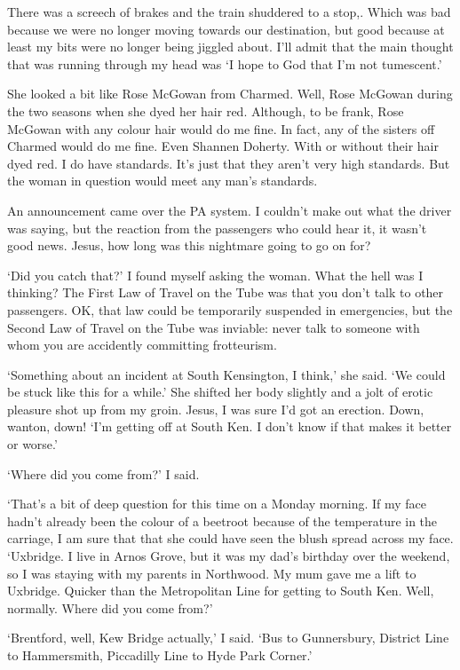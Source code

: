 There was a screech of brakes and the train shuddered to a stop,.
Which was bad because we were no longer moving towards our
destination, but good because at least my bits were no longer being
jiggled about. I'll admit that the main thought that was running
through my head was `I hope to God that I'm not tumescent.'

She looked a bit like Rose McGowan from {\twelvesl Charmed\/}. Well,
Rose McGowan during the two seasons when she dyed her hair red.
Although, to be frank, Rose McGowan with any colour hair would do me
fine. In fact, any of the sisters off {\twelvesl Charmed\/} would do me fine. Even
Shannen Doherty. With or without their hair dyed red. I do have
standards. It's just that they aren't very high standards. But the
woman in question would meet any man's standards.

An announcement came over the PA system. I couldn't make out what
the driver was saying, but the reaction from the passengers who
could hear it, it wasn't good news. Jesus, how long was this
nightmare going to go on for?

`Did you catch that?' I found myself asking the woman. What the hell
was I thinking? The First Law of Travel on the Tube was that you
don't talk to other passengers. OK, that law could be temporarily
suspended in emergencies, but the Second Law of Travel on the Tube
was inviable: never talk to someone with whom you are accidently
committing frotteurism.

`Something about an incident at South Kensington, I think,' she
said. `We could be stuck like this for a while.' She shifted her
body slightly and a jolt of erotic pleasure shot up from my groin.
Jesus, I was sure I'd got an erection. Down, wanton, down! `I'm
getting off at South Ken. I don't know if that makes it better or
worse.'

`Where did you come from?' I said.

`That's a bit of deep question for this time on a Monday morning. If
my face hadn't already been the colour of a beetroot because of the
temperature in the carriage, I am sure that that she could have seen
the blush spread across my face. `Uxbridge. I live in Arnos Grove, but
it was my dad's birthday over the weekend, so I was staying with my
parents in Northwood. My mum gave me a lift to Uxbridge.
Quicker than the Metropolitan Line for getting to South Ken. Well,
normally. Where did you come from?'

`Brentford, well, Kew Bridge actually,' I said. `Bus to Gunnersbury,
District Line to Hammersmith, Piccadilly Line to Hyde Park Corner.'

